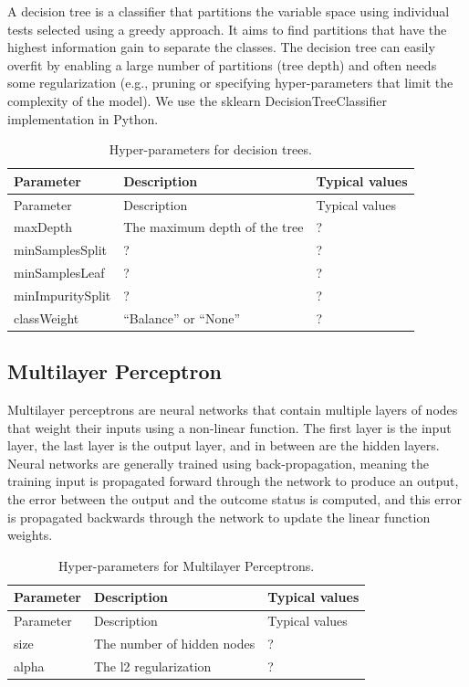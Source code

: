 \documentclass[11pt]{book}
\theoremstyle{definition}
\theoremstyle{definition}
\theoremstyle{definition}
\theoremstyle{remark}
\begin{document}
A decision tree is a classifier that partitions the variable space using individual tests selected using a greedy approach. It aims to find partitions that have the highest information gain to separate the classes. The decision tree can easily overfit by enabling a large number of partitions (tree depth) and often needs some regularization (e.g., pruning or specifying hyper-parameters that limit the complexity of the model). We use the sklearn DecisionTreeClassifier implementation in Python.  

\begin{longtable}[]{@{}lll@{}}
\caption{\label{tab:decisionTreeParameters} Hyper-parameters for decision trees.}\tabularnewline
\toprule
Parameter & Description & Typical values\tabularnewline
\midrule
\endfirsthead
\toprule
Parameter & Description & Typical values\tabularnewline
\midrule
\endhead
maxDepth & The maximum depth of the tree & ?\tabularnewline
minSamplesSplit & ? & ?\tabularnewline
minSamplesLeaf & ? & ?\tabularnewline
minImpuritySplit & ? & ?\tabularnewline
classWeight & ``Balance'' or ``None'' & ?\tabularnewline
\bottomrule
\end{longtable}

\hypertarget{multilayer-perceptron}{%
\subsection{Multilayer Perceptron}\label{multilayer-perceptron}}

Multilayer perceptrons are neural networks that contain multiple layers of nodes that weight their inputs using a non-linear function. The first layer is the input layer, the last layer is the output layer, and in between are the hidden layers. Neural networks are generally trained using back-propagation, meaning the training input is propagated forward through the network to produce an output, the error between the output and the outcome status is computed, and this error is propagated backwards through the network to update the linear function weights.   

\begin{longtable}[]{@{}lll@{}}
\caption{\label{tab:mpParameters} Hyper-parameters for Multilayer Perceptrons.}\tabularnewline
\toprule
Parameter & Description & Typical values\tabularnewline
\midrule
\endfirsthead
\toprule
Parameter & Description & Typical values\tabularnewline
\midrule
\endhead
size & The number of hidden nodes & ?\tabularnewline
alpha & The l2 regularization & ?\tabularnewline
\bottomrule
\end{longtable}
\end{document}
